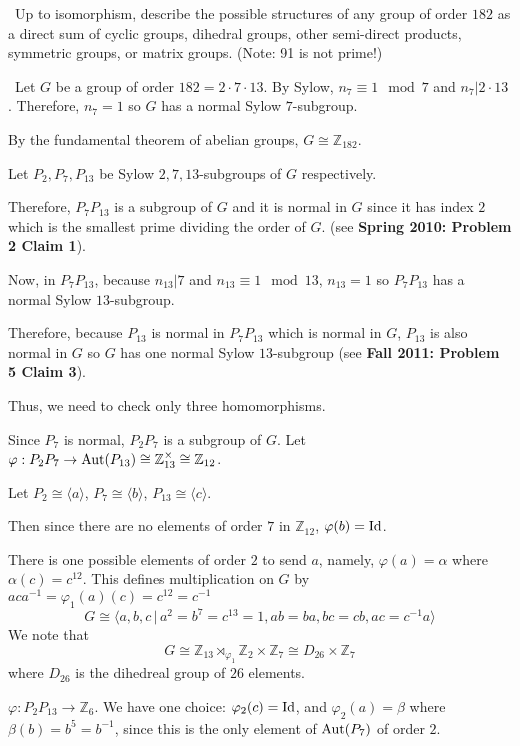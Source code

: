 \documentclass[12pt]{AlgebraQual}
\begin{document}
\begin{problem} $\,$
Up to isomorphism, describe the possible structures of any group of order $182$ as a direct sum of cyclic groups, dihedral groups, other semi-direct products, symmetric groups, or matrix groups. (Note: 91 is not prime!)
\end{problem}


\begin{solution}$\,$
Let $G$ be a group of order $182=2\cdot 7\cdot 13$. By Sylow, $n_7\equiv 1\mod 7$ and $n_7|2\cdot 13$. Therefore, $n_7=1$ so $G$ has a normal Sylow $7$-subgroup.

 By the fundamental theorem of abelian groups, $G\cong\mathbb{Z}_{182}.$

Let $P_2,P_7,P_{13}$ be Sylow $2,7,13$-subgroups of $G$ respectively.

Therefore, $P_7P_{13}$ is a subgroup of $G$ and it is normal in $G$ since it has index $2$ which is the smallest prime dividing the order of $G$. (see \textbf{Spring 2010: Problem 2 Claim 1}).

Now, in $P_7P_{13}$, because $n_{13}|7$ and $n_{13}\equiv 1\mod 13$, $n_{13}=1$ so $P_7P_{13}$ has a normal Sylow $13$-subgroup.

Therefore, because $P_{13}$ is normal in $P_7P_{13}$ which is normal in $G$, $P_{13}$ is also normal in $G$ so $G$ has one normal Sylow $13$-subgroup (see \textbf{Fall 2011: Problem 5 Claim 3}).

Thus, we need to check only three homomorphisms.

 Since $P_7$ is normal, $P_2P_7$ is a subgroup of $G$. Let $\varphi:P_2P_7\to\text{Aut}(P_{13})\cong\mathbb{Z}_{13}^\times\cong\mathbb{Z}_{12}$.

Let $P_2\cong\langle a\rangle$, $P_7\cong\langle b\rangle$, $P_{13}\cong\langle c\rangle$.

Then since there are no elements of order $7$ in $\mathbb{Z}_{12}$, $\varphi(b)=\text{Id}$.

There is one possible elements of order $2$ to send $a$, namely, $\varphi(a)=\alpha$ where $\alpha(c)=c^{12}$. This defines multiplication on $G$ by $aca^{-1}=\varphi_1(a)(c)=c^{12}=c^{-1}$ $$G\cong\langle a,b,c\,|\, a^2=b^7=c^{13}=1,ab=ba,bc=cb,ac=c^{-1}a\rangle$$ We note that $$G\cong \mathbb{Z}_{13}\rtimes_{\varphi_1}\mathbb{Z}_2\times\mathbb{Z}_7\cong D_{26}\times\mathbb{Z}_7$$ where $D_{26}$ is the dihedreal group of $26$ elements.


 $\varphi:P_2P_{13}\to\mathbb{Z}_6$. We have one choice: $\varphi_2(c)=\text{Id}$, and $\varphi_2(a)=\beta$ where $\beta(b)=b^5=b^{-1}$, since this is the only element of $\text{Aut}(P_7)$ of order $2$.


\end{solution}
\end{document}

